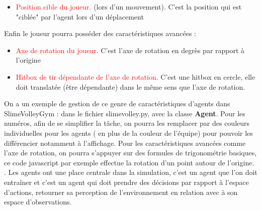 \documentclass[11pt, a4paper]{article}
\begin{document}
\begin{enumerate}
\begin{enumerate}
{\begin{itemize}
					\item \textcolor{red}{Position cible du joueur.} (lors d'un mouvement).
					C'est la position qui est "ciblée" par l'agent lors d'un déplacement

				\end{itemize}

				Enfin le joueur pourra posséder des caractéristiques avancées :
				\begin{itemize}

					\item \textcolor{red}{Axe de rotation du joueur}.
					C'est l'axe de rotation en degrès par rapport à l'origine

					\item \textcolor{red}{Hitbox de tir dépendante de l'axe de rotation}.
					C'est une hitbox en cercle, elle doit translatée (être dépendante) dans le même sens que l'axe de rotation.


				\end{itemize}
			}
			{
				On a un exemple de gestion de ce genre de caractéristiques d'agents dans SlimeVolleyGym : dans le fichier slimevolley.py, avec la classe \textbf{Agent}. Pour les numéros, afin de se simplifier la tâche, on pourra les remplacer par des couleurs individuelles pour les agents ( en plus de la couleur de l'équipe) pour pouvoir les différencier notamment à l'affichage.
				Pour les caractéristiques avancées comme l'axe de rotation, on pourra s'appuyer sur des formules de trigonométrie basiques, ce code javascript par exemple effectue la rotation d'un point autour
				de l'origine. \cite{trigonometry1}.
			}
			{
				Les agents ont une place centrale dans la simulation, c'est un agent que l'on doit entraîner et c'est un agent qui doit prendre des décisions par rapport à l'espace d'actions, retourner sa perception de l'environnement en relation avec à son espace d'observations.}



\end{enumerate}
\end{enumerate}
\end{document}
